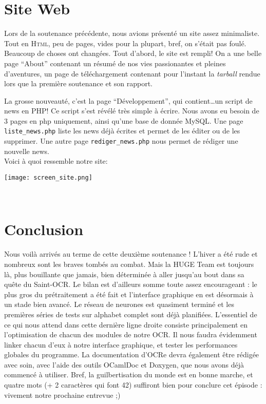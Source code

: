 \documentclass[a4paper,10pt]{report}
\begin{document}
\chapter{Site Web} %
\label{cha:site_web}
	Lors de la soutenance pr\'ec\'edente, nous avions pr\'esent\'e un site assez minimaliste. Tout en \textsc{Html}, peu de pages, vides pour la plupart, bref, on s'\'etait pas foul\'e. Beaucoup de choses ont chang\'ees. Tout d'abord, le site est rempli! On a une belle page ``About'' contenant un r\'esum\'e de nos vies passionantes et pleines d'aventures, un page de t\'el\'echargement contenant pour l'instant la \emph{tarball} rendue lors que la premi\`ere soutenance et son rapport.
	
	La grosse nouveaut\'e, c'est la page ``D\'eveloppement'', qui contient\ldots un script de news en PHP! Ce script s'est r\'ev\'el\'e tr\`es simple \`a \'ecrire. Nous avons eu besoin de 3 pages en php uniquement, ainsi qu'une base de donn\'ee MySQL. Une page \verb!liste_news.php! liste les news d\'ej\`a \'ecrites et permet de les \'editer ou de les supprimer. Une autre page \verb!rediger_news.php! nous permet de r\'ediger une nouvelle news. \\
	Voici à quoi ressemble notre site:
	
	
	\begin{center}

		\texttt{[image: screen\_site.png]}\\
		\caption{\emph{Calcul de la sortie d'un neurone}}\\
	\end{center}

	

\chapter{Conclusion} %
\label{cha:conclusion}

Nous voil\`a arriv\'es au terme de cette deuxi\`eme soutenance ! L'hiver
a \'et\'e rude et nombreux sont les braves tomb\'es au combat. Mais la HUGE Team est
toujours l\`a, plus bouillante que jamais, bien d\'etermin\'ee \`a aller
jusqu'au bout dans sa qu\^ete du Saint-OCR. 
Le bilan est d'ailleurs somme toute assez encourageant : le plus gros du
pr\'etraitement a \'et\'e fait et l'interface graphique en est
d\'esormais \`a un stade bien avanc\'e. Le r\'eseau de neurones est
quasiment termin\'e et les premi\`eres s\'eries de tests sur alphabet
complet sont d\'ej\`a planifi\'ees. L'essentiel de ce qui nous attend
dans cette derni\`ere ligne droite consiste principalement en
l'optimisation de chacun des modules de notre OCR. Il nous faudra \'evidemment linker
chacun d'eux \`a notre interface graphique, et tester les performances
globales du programme. La documentation d'OCRe devra \'egalement \^etre
r\'edig\'ee avec soin, avec l'aide des outils OCamlDoc et Doxygen, que
nous avons d\'ej\`a commenc\'e \`a utiliser. Bref, la guilbertisation du
monde est en bonne marche, et quatre mots (+ 2 caract\`eres qui font 42) suffiront bien pour conclure
cet épisode : vivement notre prochaine entrevue ;)
\end{document}
